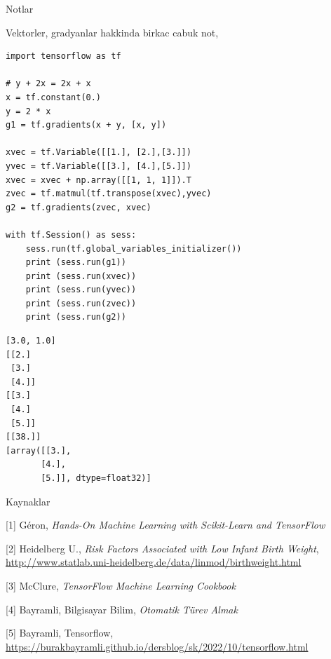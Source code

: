 \documentclass[12pt,fleqn]{article}\usepackage{../../common}
\begin{document}
Notlar

Vektorler, gradyanlar hakkinda birkac cabuk not,

\begin{verbatim}
import tensorflow as tf

# y + 2x = 2x + x
x = tf.constant(0.)
y = 2 * x
g1 = tf.gradients(x + y, [x, y])

xvec = tf.Variable([[1.], [2.],[3.]]) 
yvec = tf.Variable([[3.], [4.],[5.]]) 
xvec = xvec + np.array([[1, 1, 1]]).T
zvec = tf.matmul(tf.transpose(xvec),yvec)
g2 = tf.gradients(zvec, xvec)

with tf.Session() as sess:
    sess.run(tf.global_variables_initializer())
    print (sess.run(g1))
    print (sess.run(xvec))
    print (sess.run(yvec))
    print (sess.run(zvec))
    print (sess.run(g2))
\end{verbatim}

\begin{verbatim}
[3.0, 1.0]
[[2.]
 [3.]
 [4.]]
[[3.]
 [4.]
 [5.]]
[[38.]]
[array([[3.],
       [4.],
       [5.]], dtype=float32)]
\end{verbatim}

Kaynaklar 

[1] Géron, {\em Hands-On Machine Learning with Scikit-Learn and TensorFlow}

[2] Heidelberg U., {\em Risk Factors Associated with Low Infant Birth Weight}, \url{http://www.statlab.uni-heidelberg.de/data/linmod/birthweight.html}

[3] McClure, {\em TensorFlow Machine Learning Cookbook}

[4] Bayramli, Bilgisayar Bilim, {\em Otomatik Türev Almak}

[5] Bayramli, Tensorflow, \url{https://burakbayramli.github.io/dersblog/sk/2022/10/tensorflow.html}
\end{document}

